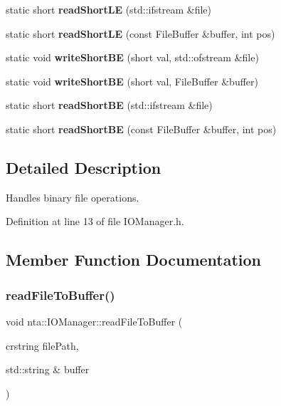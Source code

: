\begin{DoxyCompactItemize}
\mbox{\label{classnta_1_1IOManager_a8b27fbf996c44a65b0af6b828d8e9c77}} 
static short {\bfseries read\+Short\+LE} (std\+::ifstream \&file)
\item 
\mbox{\label{classnta_1_1IOManager_a919417bb852149b2b26e39701f39d1e7}} 
static short {\bfseries read\+Short\+LE} (const File\+Buffer \&buffer, int pos)
\item 
\mbox{\label{classnta_1_1IOManager_a6051d755ed8d3ec7decb1220e074ff7f}} 
static void {\bfseries write\+Short\+BE} (short val, std\+::ofstream \&file)
\item 
\mbox{\label{classnta_1_1IOManager_ae259ec671f9b93d9cb187ef90f099529}} 
static void {\bfseries write\+Short\+BE} (short val, File\+Buffer \&buffer)
\item 
\mbox{\label{classnta_1_1IOManager_a7efe1f57000ebd15ec5cdd7266183495}} 
static short {\bfseries read\+Short\+BE} (std\+::ifstream \&file)
\item 
\mbox{\label{classnta_1_1IOManager_a110e5635fb70e27268c9feeac9ac9a09}} 
static short {\bfseries read\+Short\+BE} (const File\+Buffer \&buffer, int pos)
\end{DoxyCompactItemize}


\subsection{Detailed Description}
Handles binary file operations. 

Definition at line 13 of file I\+O\+Manager.\+h.



\subsection{Member Function Documentation}
\mbox{\label{classnta_1_1IOManager_abbfd9da05b22aa488043a19344d38e0a}} 
\subsubsection{\texorpdfstring{read\+File\+To\+Buffer()}{readFileToBuffer()}}
{\footnotesize\ttfamily void nta\+::\+I\+O\+Manager\+::read\+File\+To\+Buffer (\begin{DoxyParamCaption}\item[{crstring}]{file\+Path,  }\item[{std\+::string \&}]{buffer }\end{DoxyParamCaption})\hspace{0.3cm}{\ttfamily [static]}}

